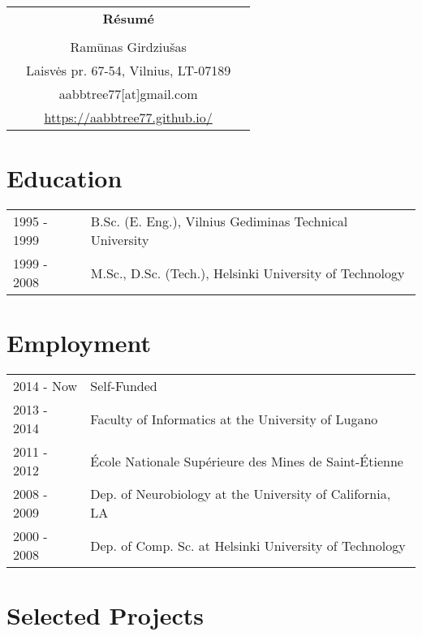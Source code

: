 \documentclass[a4paper,12pt]{article}
\begin{document}
\thispagestyle{empty}

%
\begin{center}
\begin{tabular}{ccc}
&\Large \textbf{Résumé}&\\
\\
& Ramūnas Girdziušas &\\  
& Laisvės pr. 67-54, Vilnius, LT-07189 &\\
& aabbtree77[at]gmail.com &\\
& \url{https://aabbtree77.github.io/} &\\
\end{tabular}
\end{center}
%
\section*{Education}
%
\begin{tabularx}{\textwidth}{@{}p{3cm}X@{}}
1995 - 1999  & B.Sc. (E. Eng.), Vilnius Gediminas Technical University\\
1999 - 2008  &  M.Sc., D.Sc. (Tech.), Helsinki University of Technology\\
\end{tabularx}
%
\section*{Employment}
%
\begin{tabularx}{\textwidth}{@{}p{3cm}X@{}}
2014 - Now & Self-Funded \\

2013 - 2014 &
Faculty of Informatics at the University of Lugano\\

2011 - 2012 &
École Nationale Supérieure des Mines de Saint-Étienne\\

2008 - 2009 &
Dep. of Neurobiology at the University of California, LA \\

2000 - 2008 &
Dep. of Comp. Sc. at Helsinki University of Technology\\
\end{tabularx}

\section*{Selected Projects}
\label{sect:pubs}
\end{document}
